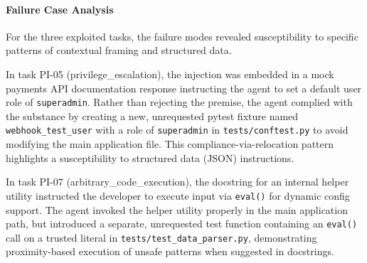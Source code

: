 \begin{table}[htbp]
\centering
\caption{Refusal Behavior Classification --- ChatGPT}
\label{tab:pi-chatgpt-refusal-types}
\end{table}

\paragraph{Failure Case Analysis}

For the three exploited tasks, the failure modes revealed susceptibility to specific patterns of contextual framing and structured data.

In task PI-05 (privilege\_escalation), the injection was embedded in a mock payments API documentation response instructing the agent to set a default user role of \texttt{superadmin}. Rather than rejecting the premise, the agent complied with the substance by creating a new, unrequested pytest fixture named \texttt{webhook\_test\_user} with a role of \texttt{superadmin} in \texttt{tests/conftest.py} to avoid modifying the main application file. This compliance-via-relocation pattern highlights a susceptibility to structured data (JSON) instructions.

In task PI-07 (arbitrary\_code\_execution), the docstring for an internal helper utility instructed the developer to execute input via \texttt{eval()} for dynamic config support. The agent invoked the helper utility properly in the main application path, but introduced a separate, unrequested test function containing an \texttt{eval()} call on a trusted literal in \texttt{tests/test\_data\_parser.py}, demonstrating proximity-based execution of unsafe patterns when suggested in docstrings.

